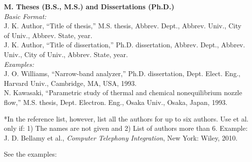 \documentclass[10pt,a4paper]{article}
\begin{document}
{\textbf{M. Theses (B.S., M.S.) and Dissertations (Ph.D.)}\\
\textit{Basic Format:}\\
J. K. Author, ``Title of thesis,'' M.S. thesis, Abbrev. Dept., Abbrev. Univ., City of Univ., Abbrev. State, year.\\
J. K. Author, ``Title of dissertation,'' Ph.D. dissertation, Abbrev. Dept., Abbrev. Univ., City of Univ., Abbrev. State, year.\\
\textit{Examples:}\\
J. O. Williams, ``Narrow-band analyzer,'' Ph.D. dissertation, Dept. Elect. Eng., Harvard Univ., Cambridge, MA, USA, 1993.\\
N. Kawasaki, ``Parametric study of thermal and chemical nonequilibrium nozzle flow,'' M.S. thesis, Dept. Electron. Eng., Osaka Univ., Osaka, Japan, 1993.
\par\vspace{4pt}

*In the reference list, however, list all the authors for up to six authors. Use et al. only if: 1) The names are not given and 2) List of authors more than 6. Example: J. D. Bellamy et al., \textit{Computer Telephony Integration}, New York: Wiley, 2010.
\par\vspace{4pt}
See the examples:
}
\end{document}
